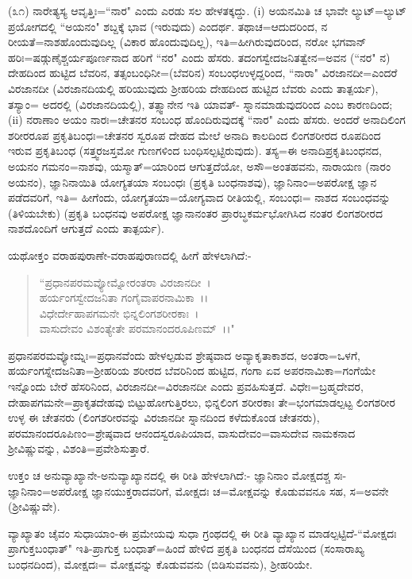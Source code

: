 (೩೧) ನಾರೇತ್ಯಸ್ಯ ಆವೃತ್ತಿಃ=``ನಾರ" ಎಂದು ಎರಡು ಸಲ ಹೇಳತಕ್ಕದ್ದು. (i) ಅಯನಮಿತಿ ಚ ಭಾವೇ ಲ್ಯುಟ್=ಲ್ಯುಟ್ ಪ್ರಯೋಗದಲ್ಲಿ ``ಅಯನಂ" ಶಬ್ದಕ್ಕೆ ಭಾವ (ಇರುವುದು) ಎಂದರ್ಥ. ತಥಾಚ=ಆದುದರಿಂದ, ನ ರೀಯತೆ=ನಾಶಹೊಂದುವುದಿಲ್ಲ (ವಿಕಾರ ಹೊಂದುವುದಿಲ್ಲ), ಇತಿ=ಹೀಗಿರುವುದರಿಂದ, ನರೋ ಭಗವಾನ್ ಹರಿಃ=ಷಡ್ಗುಣೈಶ್ಚರ್ಯಪೂರ್ಣನಾದ ಹರಿಗೆ ``ನರ" ಎಂದು ಹೆಸರು. ತದಂಗಸ್ವೇದಜನಿತತ್ವೇನ=ಅವನ (``ನರ" ನ) ದೇಹದಿಂದ ಹುಟ್ಟಿದ ಬೆವರಿನ, ತತ್ಸಂಬಂಧಿನೀ=(ಬೆವರಿನ) ಸಂಬಂಧಉಳ್ಳದ್ದರಿಂದ, ``ನಾರಾ" ವಿರಜಾನದೀ=ಎಂದರೆ ವಿರಜಾನದೀ (ವಿರಜಾನದಿಯಲ್ಲಿ ಹರಿಯುವುದು ಶ‍್ರೀಹರಿಯ ದೇಹದಿಂದ ಹುಟ್ಟಿದ ಬೆವರು ಎಂದು ತಾತ್ಪರ್ಯ), ತಸ್ಯಾಂ= ಅದರಲ್ಲಿ (ವಿರಜಾನದಿಯಲ್ಲಿ), ತತ್ಸ್ವಾನೇನ ಇತಿ ಯಾವತ್- ಸ್ನಾನಮಾಡುವುದರಿಂದ ಎಂಬ ಕಾರಣದಿಂದ; (ii) ನರಾಣಾಂ ಅಯಂ ನಾರಃ=ಚೇತನರ ಸಂಬಂಧ ಹೊಂದಿರುವುದಕ್ಕೆ ``ನಾರ" ಎಂದು ಹೆಸರು. ಅಂದರೆ ಅನಾದಿಲಿಂಗ ಶರೀರರೂಪ ಪ್ರಕೃತಿಬಂಧಃ=ಚೇತನರ ಸ್ವರೂಪ ದೇಹದ ಮೇಲೆ ಅನಾದಿ ಕಾಲದಿಂದ ಲಿಂಗಶರೀರದ ರೂಪದಿಂದ ಇರುವ ಪ್ರಕೃತಿಬಂಧ (ಸತ್ತ್ವರಜಸ್ತಮೋ ಗುಣಗಳಿಂದ ಬಂಧಿಸಲ್ಪಟ್ಟಿರುವುದು). ತಸ್ಯ=ಈ ಅನಾದಿಪ್ರಕೃತಿಬಂಧನದ, ಅಯನಂ ಗಮನಂ=ನಾಶವು, ಯಸ್ಮಾತ್=ಯಾರಿಂದ ಆಗುತ್ತದೆಯೋ, ಅಸೌ=ಅಂತಹವನು, ನಾರಾಯಣ (ನಾರಂ ಅಯನಂ), ಜ್ಞಾನಿನಾಯಿತಿ ಯೋಗ್ಯತಯಾ ಸಂಬಂಧಃ (ಪ್ರಕೃತಿ ಬಂಧನಾಶವು), ಜ್ಞಾನಿನಾಂ=ಅಪರೋಕ್ಷ ಜ್ಞಾನ ಪಡೆದವರಿಗೆ, ಇತಿ= ಹೀಗೆಂದು, ಯೋಗ್ಯತಯಾ=ಯೋಗ್ಯವಾದ ರೀತಿಯಲ್ಲಿ, ಸಂಬಂಧಃ= ನಾಶದ ಸಂಬಂಧವನ್ನು (ತಿಳಿಯಬೇಕು) (ಪ್ರಕೃತಿ ಬಂಧನವು ಅಪರೋಕ್ಷ ಜ್ಞಾನಾನಂತರ ಪ್ರಾರಬ್ಧಕರ್ಮಭೋಗಿಸಿದ ನಂತರ ಲಿಂಗಶರೀರದ ನಾಶದೊಂದಿಗೆ ಆಗುತ್ತದೆ ಎಂದು ತಾತ್ಪರ್ಯ).

ಯಥೋಕ್ತಂ ವರಾಹಪುರಾಣೇ-ವರಾಹಪುರಾಣದಲ್ಲಿ ಹೀಗೆ ಹೇಳಲಾಗಿದೆ:-

\begin{verse}
``ಪ್ರಧಾನಪರಮವ್ಯೋಮ್ನೋರಂತರಾ ವಿರಜಾನದೀ~।\\ ಹರ್ಯಂಗಸ್ವೇದಜನಿತಾ ಗಂಗೈವಾಪರನಾಮಿಕಾ~।।\\ ವಿಧೇರ್ದೇಹಾಪಗಮನೇ ಭಿನ್ನಲಿಂಗಶರೀರಕಾಃ~।\\ ವಾಸುದೇವಂ ವಿಶಂತ್ಯೇತೇ ಪರಮಾನಂದರೂಪಿಣಮ್~।।"
\end{verse}

ಪ್ರಧಾನಪರಮವ್ಯೋಮ್ನಃ=ಪ್ರಧಾನವೆಂದು ಹೇಳಲ್ಪಡುವ ಶ್ರೇಷ್ಠವಾದ ಅವ್ಯಾಕೃತಾಕಾಶದ, ಅಂತರಾ=ಒಳಗೆ, ಹರ್ಯಂಗಸ್ನೇದಜನಿತಾ=ಶ‍್ರೀಹರಿಯ ಶರೀರದ ಬೆವರಿನಿಂದ ಹುಟ್ಟಿದ, ಗಂಗಾ ಏವ ಅಪರನಾಮಿಕಾ=ಗಂಗೆಯೇ ಇನ್ನೊಂದು ಬೇರೆ ಹೆಸರಿನಿಂದ, ವಿರಜಾನದೀ=ವಿರಜಾನದೀ ಎಂದು ಪ್ರವಹಿಸುತ್ತದೆ. ವಿಧೇಃ=ಬ್ರಹ್ಮದೇವರ, ದೇಹಾಪಗಮನೇ=ಪ್ರಾಕೃತದೇಹವು ಬಿಟ್ಟುಹೋಗುತ್ತಿರಲು, ಭಿನ್ನಲಿಂಗ ಶರೀರಕಾಃ ತೇ=ಭಂಗಮಾಡಲ್ಪಟ್ಟ ಲಿಂಗಶರೀರ ಉಳ್ಳ ಈ ಚೇತನರು (ಲಿಂಗಶರೀರವನ್ನು ವಿರಜಾನದೀ ಸ್ನಾನದಿಂದ ಕಳೆದುಕೊಂಡ ಚೇತನರು), ಪರಮಾನಂದರೂಪಿಣಂ=ಶ್ರೇಷ್ಠವಾದ ಆನಂದಸ್ವರೂಪಿಯಾದ, ವಾಸುದೇವಂ=ವಾಸುದೇವ ನಾಮಕನಾದ ಶ‍್ರೀವಿಷ್ಣುವನ್ನು, ವಿಶಂತಿ=ಪ್ರವೇಶಿಸುತ್ತಾರೆ.

ಉಕ್ತಂ ಚ ಅನುವ್ಯಾಖ್ಯಾನೇ-ಅನುವ್ಯಾಖ್ಯಾನದಲ್ಲಿ ಈ ರೀತಿ ಹೇಳಲಾಗಿದೆ:- ಜ್ಞಾನಿನಾಂ ಮೋಕ್ಷದಶ್ಚ ಸಃ- ಜ್ಞಾನಿನಾಂ=ಅಪರೋಕ್ಷ ಜ್ಞಾನಯುಕ್ತರಾದವರಿಗೆ, ಮೋಕ್ಷದಃ ಚ=ಮೋಕ್ಷವನ್ನು ಕೊಡುವವನೂ ಸಹ, ಸ=ಅವನೇ (ಶ‍್ರೀವಿಷ್ಣುವೇ).

ವ್ಯಾಖ್ಯಾತಂ ಚೈವಂ ಸುಧಾಯಾಂ-ಈ ಪ್ರಮೇಯವು ಸುಧಾ ಗ್ರಂಥದಲ್ಲಿ ಈ ರೀತಿ ವ್ಯಾಖ್ಯಾನ ಮಾಡಲ್ಪಟ್ಟಿದೆ-``ಮೋಕ್ಷದಃ ಪ್ರಾಗುಕ್ತಬಂಧಾತ್" ಇತಿ-ಪ್ರಾಗುಕ್ತ ಬಂಧಾತ್=ಹಿಂದೆ ಹೇಳಿದ ಪ್ರಕೃತಿ ಬಂಧನದ ದೆಸೆಯಿಂದ (ಸಂಸಾರಾಖ್ಯ ಬಂಧನದಿಂದ), ಮೋಕ್ಷದಃ= ಮೋಕ್ಷವನ್ನು ಕೊಡುವವನು (ಬಿಡಿಸುವವನು), ಶ‍್ರೀಹರಿಯೇ.


